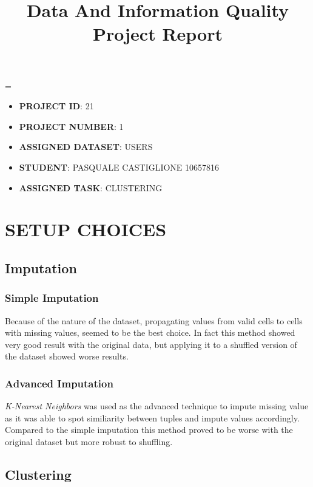 \documentclass{article}
\title{
	\vspace{4cm}
	\textbf{Data And Information Quality Project Report}\\
}
\author{}
\date{}
\newcommand{\justified}
{
	\tolerance=1
	\emergencystretch=\maxdimen
	\hyphenpenalty=10000
	\hbadness=10000
}
\begin{document}
\maketitle
\vfill
\justified
\begin{itemize}
	\item\textbf{PROJECT ID}: 21
	\item\textbf{PROJECT NUMBER}: 1
	\item\textbf{ASSIGNED DATASET}: USERS
	\item\textbf{STUDENT}: PASQUALE CASTIGLIONE 10657816
	\item\textbf{ASSIGNED TASK}: CLUSTERING
\end{itemize}

\newpage

\tableofcontents

\newpage



\section{SETUP CHOICES}

\subsection{Imputation}

\subsubsection{Simple Imputation}
Because of the nature of the dataset, propagating values from valid cells to cells with missing values, seemed to be the best choice. In fact this method showed very good result with the original data, but applying it to a shuffled version of the dataset showed worse results.  

\subsubsection{Advanced Imputation}
\emph{K-Nearest Neighbors} was used as the advanced technique to impute missing value as it was able to spot similiarity between tuples and impute values accordingly. Compared to the simple imputation this method proved to be worse with the original dataset but more robust to shuffling.

\subsection{Clustering}
\end{document}
